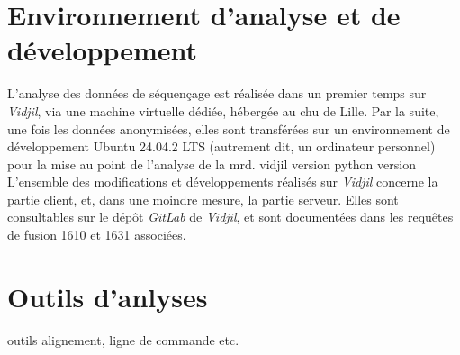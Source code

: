 \section{Environnement d'analyse et de développement}

L'analyse des données de séquençage est réalisée dans un premier temps sur \textit{Vidjil}, via une machine virtuelle dédiée,
hébergée au \gls{chu} de Lille. Par la suite, une fois les données anonymisées, elles sont transférées sur un environnement de 
développement Ubuntu 24.04.2 LTS (autrement dit, un ordinateur personnel) pour la mise au point de l'analyse de la \gls{mrd}.
vidjil version
python version
L'ensemble des modifications et développements réalisés sur \textit{Vidjil} concerne la partie client, et, dans une moindre mesure,
la partie serveur. Elles sont consultables sur le dépôt \href{https://gitlab.inria.fr/users/x-benha/activity}{\textit{GitLab}}
de \textit{Vidjil}, et sont documentées dans les requêtes de fusion \href{https://gitlab.inria.fr/vidjil/vidjil/-/merge_requests/1610}{1610}
et \href{https://gitlab.inria.fr/vidjil/vidjil/-/merge_requests/1631}{1631} associées.

\section{Outils d'anlyses}

outils alignement, ligne de commande etc.


